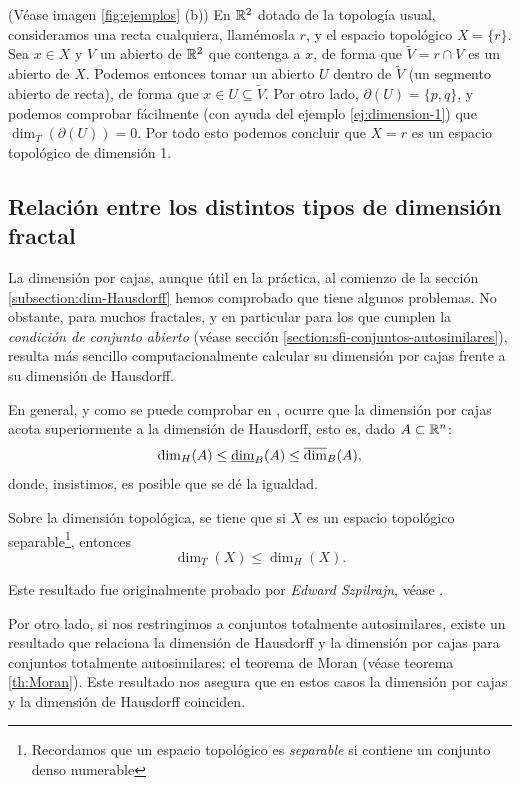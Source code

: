 \begin{ejemplo}
(Véase imagen \ref{fig:ejemplos} (b))
En $\mathbb{R}^2$ dotado de la topología usual, consideramos una recta cualquiera, llamémosla $r$, y el espacio topológico $X=\{r\}$. Sea $x\in X$ y $V$ un abierto de $\mathbb{R}^2$ que contenga a $x$, de forma que $\tilde{V} = r\cap V$ es un abierto de $X$. Podemos entonces tomar un abierto $U$ dentro de $\tilde{V}$ (un segmento abierto de recta), de forma que $x\in U\subseteq \tilde{V}$. Por otro lado, $\partial(U)=\{p,q\}$, y podemos comprobar fácilmente (con ayuda del ejemplo \ref{ej:dimension-1}) que $\dim_T(\partial(U))=0$. Por todo esto podemos concluir que $X=r$ es un espacio topológico de dimensión 1. 
\end{ejemplo}

\subsection{Relación entre los distintos tipos de dimensión fractal}
\label{subsection:relacion-dimensiones}

La dimensión por cajas, aunque útil en la práctica, al comienzo de la sección \ref{subsection:dim-Hausdorff} hemos comprobado que tiene algunos problemas. No obstante, para muchos fractales, y en particular para los que cumplen la \textit{condición de conjunto abierto} (véase sección \ref{section:sfi-conjuntos-autosimilares}), resulta más sencillo computacionalmente calcular su dimensión por cajas frente a su dimensión de Hausdorff.

En general, y como se puede comprobar en \cite[Sección 3.1]{alma991007022459704990}, ocurre que la dimensión por cajas acota superiormente a la dimensión de Hausdorff, esto es, dado $A\subset\mathbb{R}^n$:
$$
\dim_H(A)\leq\underline{\dim}_B (A) \leq \overline{\dim}_B (A),
$$
donde, insistimos, es posible que se dé la igualdad.

Sobre la dimensión topológica, se tiene que si $X$ es un espacio topológico separable\footnote{Recordamos que un espacio topológico es \textit{separable} si contiene un conjunto denso numerable}, entonces
$$
\dim_T(X)\leq\dim_H(X).
$$

Este resultado fue originalmente probado por \textit{Edward Szpilrajn}, véase \cite[Capítulo VII]{Hurewicz-Wallman}.

Por otro lado, si nos restringimos a conjuntos totalmente autosimilares, existe un resultado que relaciona la dimensión de Hausdorff y la dimensión por cajas para conjuntos totalmente autosimilares: el teorema de Moran (véase teorema \ref{th:Moran}). Este resultado nos asegura que en estos casos la dimensión por cajas y la dimensión de Hausdorff coinciden. 

